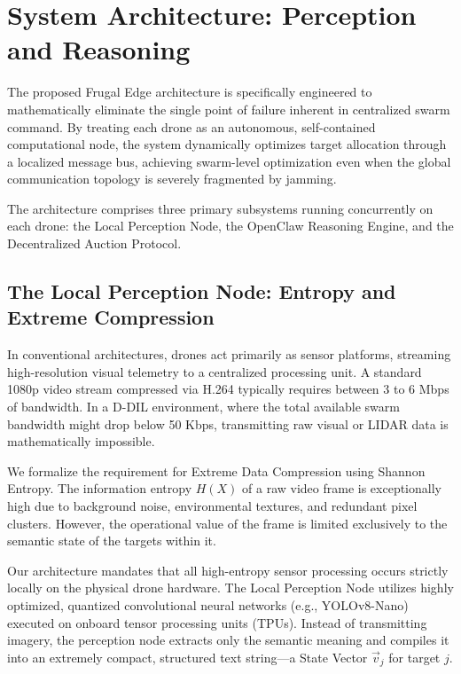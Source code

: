 \section{System Architecture: Perception and Reasoning}

The proposed Frugal Edge architecture is specifically engineered to mathematically eliminate the single point of failure inherent in centralized swarm command. By treating each drone as an autonomous, self-contained computational node, the system dynamically optimizes target allocation through a localized message bus, achieving swarm-level optimization even when the global communication topology is severely fragmented by jamming.

The architecture comprises three primary subsystems running concurrently on each drone: the Local Perception Node, the OpenClaw Reasoning Engine, and the Decentralized Auction Protocol.

\subsection{The Local Perception Node: Entropy and Extreme Compression}
In conventional architectures, drones act primarily as sensor platforms, streaming high-resolution visual telemetry to a centralized processing unit. A standard 1080p video stream compressed via H.264 typically requires between 3 to 6 Mbps of bandwidth. In a D-DIL environment, where the total available swarm bandwidth might drop below 50 Kbps, transmitting raw visual or LIDAR data is mathematically impossible. 

We formalize the requirement for Extreme Data Compression using Shannon Entropy. The information entropy $H(X)$ of a raw video frame is exceptionally high due to background noise, environmental textures, and redundant pixel clusters. However, the operational value of the frame is limited exclusively to the semantic state of the targets within it. 

Our architecture mandates that all high-entropy sensor processing occurs strictly locally on the physical drone hardware. The Local Perception Node utilizes highly optimized, quantized convolutional neural networks (e.g., YOLOv8-Nano) executed on onboard tensor processing units (TPUs). Instead of transmitting imagery, the perception node extracts only the semantic meaning and compiles it into an extremely compact, structured text string—a State Vector $\vec{v}_j$ for target $j$.

